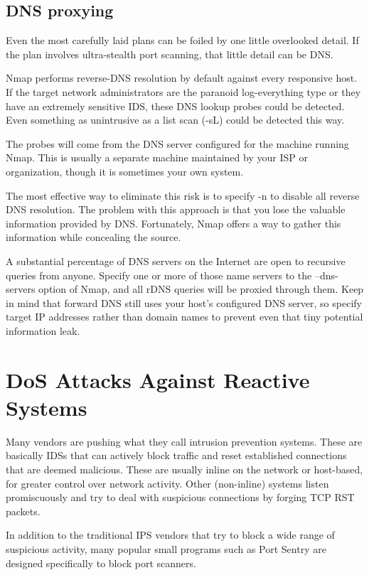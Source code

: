 \subsection{DNS proxying}
Even the most carefully laid plans can be foiled by one little overlooked detail. 
If the plan involves ultra-stealth port scanning, that little detail can be DNS. 

Nmap performs reverse-DNS resolution by default against every responsive host. 
If the target network administrators are the paranoid log-everything type or they have an extremely sensitive IDS, 
these DNS lookup probes could be detected. 
Even something as unintrusive as a list scan (-sL) could be detected this way.

The probes will come from the DNS server configured for the machine running Nmap. 
This is usually a separate machine maintained by your ISP or organization, though it is sometimes your own system.

The most effective way to eliminate this risk is to specify -n to disable all reverse DNS resolution. 
The problem with this approach is that you lose the valuable information provided by DNS. 
Fortunately, Nmap offers a way to gather this information while concealing the source.

A substantial percentage of DNS servers on the Internet are open to recursive queries from anyone. 
Specify one or more of those name servers to the --dns-servers option of Nmap, and all rDNS queries will be proxied through them.
Keep in mind that forward DNS still uses your host's configured DNS server, so specify target IP addresses rather than domain 
names to prevent even that tiny potential information leak.


\section{DoS Attacks Against Reactive Systems}
Many vendors are pushing what they call intrusion prevention systems. 
These are basically IDSs that can actively block traffic and reset established connections that are deemed malicious. 
These are usually inline on the network or host-based, for greater control over network activity. 
Other (non-inline) systems listen promiscuously and try to deal with suspicious connections by forging TCP RST packets.

In addition to the traditional IPS vendors that try to block a wide range of suspicious activity, 
many popular small programs such as Port Sentry are designed specifically to block port scanners.

